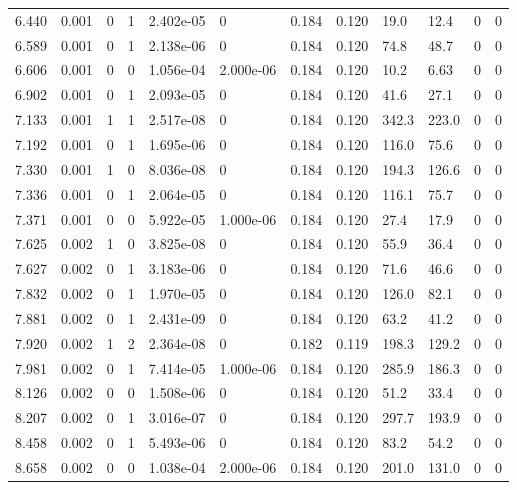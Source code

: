 \documentclass[preview]{standalone}
\begin{document}
{{{\begin{tabular}{L{1.2cm}C{1.2cm} C{0.3cm}C{0.5cm} C{1.4cm}C{1.4cm} C{1.4cm}C{1.4cm} C{1.6cm}C{1.6cm} C{1.6cm}C{1.6cm}}
  6.440  &  0.001  & 0     &  1 &  2.402e-05  & 0  &  0.184&   0.120& 19.0 & 12.4   &  0 & 0  \\ 
  6.589  &  0.001  & 0     &  1 &  2.138e-06  & 0  &  0.184&   0.120& 74.8 & 48.7   &  0 & 0  \\ 
  6.606  &  0.001  & 0     &  0 &  1.056e-04  & 2.000e-06  &  0.184&   0.120& 10.2 & 6.63   &  0 & 0  \\ 
  6.902  &  0.001  & 0     &  1 &  2.093e-05  & 0  &  0.184&   0.120& 41.6 & 27.1   &  0 & 0  \\ 
  7.133  &  0.001  & 1     &  1 &  2.517e-08  & 0  &  0.184&   0.120& 342.3 & 223.0   &  0 & 0  \\ 
  7.192  &  0.001  & 0     &  1 &  1.695e-06  & 0  &  0.184&   0.120& 116.0 & 75.6   &  0 & 0  \\ 
  7.330  &  0.001  & 1     &  0 &  8.036e-08  & 0  &  0.184&   0.120& 194.3 & 126.6   &  0 & 0  \\ 
  7.336  &  0.001  & 0     &  1 &  2.064e-05  & 0  &  0.184&   0.120& 116.1 & 75.7   &  0 & 0  \\ 
  7.371  &  0.001  & 0     &  0 &  5.922e-05  & 1.000e-06  &  0.184&   0.120& 27.4 & 17.9   &  0 & 0  \\ 
  7.625  &  0.002  & 1     &  0 &  3.825e-08  & 0  &  0.184&   0.120& 55.9 & 36.4   &  0 & 0  \\ 
  7.627  &  0.002  & 0     &  1 &  3.183e-06  & 0  &  0.184&   0.120& 71.6 & 46.6   &  0 & 0  \\ 
  7.832  &  0.002  & 0     &  1 &  1.970e-05  & 0  &  0.184&   0.120& 126.0 & 82.1   &  0 & 0  \\ 
  7.881  &  0.002  & 0     &  1 &  2.431e-09  & 0  &  0.184&   0.120& 63.2 & 41.2   &  0 & 0  \\ 
  7.920  &  0.002  & 1     &  2 &  2.364e-08  & 0  &  0.182&   0.119& 198.3 & 129.2   &  0 & 0  \\ 
  7.981  &  0.002  & 0     &  1 &  7.414e-05  & 1.000e-06  &  0.184&   0.120& 285.9 & 186.3   &  0 & 0  \\ 
  8.126  &  0.002  & 0     &  0 &  1.508e-06  & 0  &  0.184&   0.120& 51.2 & 33.4   &  0 & 0  \\ 
  8.207  &  0.002  & 0     &  1 &  3.016e-07  & 0  &  0.184&   0.120& 297.7 & 193.9   &  0 & 0  \\ 
  8.458  &  0.002  & 0     &  1 &  5.493e-06  & 0  &  0.184&   0.120& 83.2 & 54.2   &  0 & 0  \\ 
  8.658  &  0.002  & 0     &  0 &  1.038e-04  & 2.000e-06  &  0.184&   0.120& 201.0 & 131.0   &  0 & 0  \\ 

\end{tabular}}}}
\end{document}
